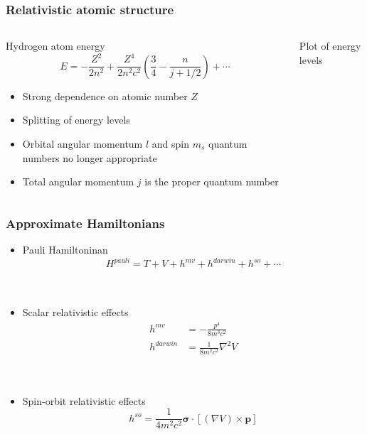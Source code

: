 \documentclass[mathserif,10pt]{beamer}
\begin{document}
\begin{frame}
    \frametitle{Relativistic atomic structure}
    \begin{columns}
    \begin{column}{.40\textwidth}
	\centering
	Hydrogen atom energy
	\begin{equation}
	    \nonumber
	    E = -\frac{Z^2}{2n^2} + \frac{Z^4}{2n^2c^2}\left(\frac{3}{4}-\frac{n}{j+1/2}\right) + \cdots
	\end{equation}
	\begin{itemize}
	    \item Strong dependence on atomic number $Z$
	    \item Splitting of energy levels 
	    \item Orbital angular momentum $l$ and spin $m_s$ quantum numbers no longer appropriate
	    \item Total angular momentum $j$ is the proper quantum number
	\end{itemize}
    \end{column}
    \begin{column}{.40\textwidth}
    Plot of energy levels\\
    \end{column}
    \end{columns}
\end{frame}

\begin{frame}
    \frametitle{Approximate Hamiltonians}
    \begin{itemize}
    \item Pauli Hamiltoninan
    \begin{equation}
	\nonumber
	H^{pauli} = T + V + h^{mv} + h^{darwin} + h^{so} + \cdots
    \end{equation}
    \ \\
    \ \\
    \item Scalar relativistic effects
    \begin{align}
	\nonumber
	h^{mv} &= -\frac{p^4}{8m^3c^2}\\
	\nonumber
	h^{darwin} &= \frac{1}{8m^2c^2} \nabla^2V
    \end{align}
    \ \\
    \ \\
    \item Spin-orbit relativistic effects
    \ \\
    \begin{equation}
	\nonumber
	h^{so} = \frac{1}{4m^2c^2}\boldsymbol{\sigma}\cdot\left[\left(\nabla V\right)\times\boldsymbol{p}\right]
    \end{equation}
    \end{itemize}
\end{frame}
\end{document}
